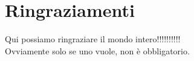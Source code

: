 \documentclass[12pt,a4paper,openright,twoside]{report}
\begin{document}
\clearpage{\pagestyle{empty}\cleardoublepage}
\chapter*{Ringraziamenti}
\thispagestyle{empty}
Qui possiamo ringraziare il mondo intero!!!!!!!!!!\\
Ovviamente solo se uno vuole, non \`e obbligatorio.
\end{document}
